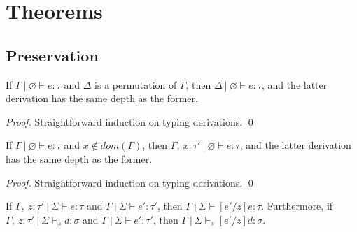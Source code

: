 \documentclass{llncs}
\begin{document}
\newpage

\section{Theorems}

\subsection{Preservation}

\begin{lemma}[Permutation]
If $\Gamma~|~\varnothing \vdash e : \tau$ and $\Delta$ is a permutation of $\Gamma$, then $\Delta~|~\varnothing \vdash e : \tau$, and the latter derivation has the same depth as the former.
\end{lemma}

\begin{proof}
Straightforward induction on typing derivations. \qed
\end{proof}

\vspace{8pt}

\begin{lemma}[Weakening]
If $\Gamma~|~\varnothing \vdash e : \tau$ and $x \not\in dom(\Gamma)$, then $\Gamma,~x : \tau'~|~\varnothing \vdash e : \tau$, and the latter derivation has the same depth as the former.
\end{lemma}

\begin{proof}
Straightforward induction on typing derivations. \qed
\end{proof}

\vspace{8pt}

\begin{lemma}
If $\Gamma,~z : \tau'~|~\Sigma \vdash e : \tau$ and $\Gamma~|~\Sigma \vdash e' : \tau'$, then $\Gamma~|~\Sigma \vdash [e'/z]e : \tau$. Furthermore, if $\Gamma,~z : \tau'~|~\Sigma \vdash_s d : \sigma$ and $\Gamma~|~\Sigma \vdash e' : \tau'$, then $\Gamma~|~\Sigma \vdash_s [e'/z]d : \sigma$.
\end{lemma}
\end{document}
